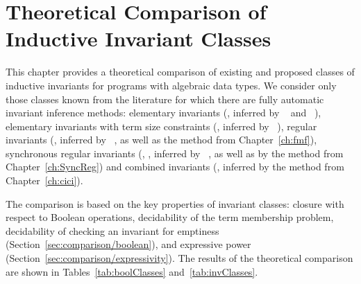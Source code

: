 \chapter{Theoretical Comparison of Inductive Invariant Classes}\label{ch:comparison}

This chapter provides a theoretical comparison of existing and proposed classes of inductive invariants for programs with algebraic data types.
We consider only those classes known from the literature for which there are fully automatic invariant inference methods: elementary invariants (\elemclass{}, inferred by \spacer{}~\cite{komuravelli2016smt} and \hoice{}~\cite{10.1007/978-3-030-02768-1_8}), elementary invariants with term size constraints (\sizeelemclass{}, inferred by \eldarica{}~\cite{8603013}), regular invariants (\regclass{}, inferred by \rchc{}~\cite{haude2020}, as well as the method from Chapter~\cref{ch:fmf}), synchronous regular invariants (\syncRegFlatClass{}, \syncRegFullClass{}, inferred by \rchc{}~\cite{haude2020}, as well as by the method from Chapter~\cref{ch:SyncReg}) and combined invariants (\regelemclass{}, inferred by the method from Chapter~\cref{ch:cici}).



The comparison is based on the key properties of invariant classes: closure with respect to Boolean operations, decidability of the term membership problem, decidability of checking an invariant for emptiness (Section~\cref{sec:comparison/boolean}), and expressive power (Section~\cref{sec:comparison/expressivity}).
The results of the theoretical comparison are shown in Tables~\cref{tab:boolClasses} and~\cref{tab:invClasses}.


